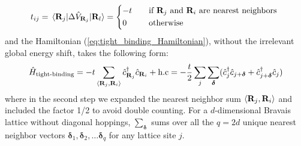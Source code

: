 \documentclass[11pt, a4paper, oneside]{book}
\theoremstyle{definition} %
\begin{document}
\begin{equation}
	t_{ij} = \mel{\mathbf{R}_j}{\Delta \hat{V}_{\mathbf{R}_j}}{\mathbf{R}_l} = \begin{dcases}
		-t \quad &\text{if $\mathbf{R}_j$ and $\mathbf{R}_i$ are nearest neighbors }\\
		0 \quad & \text{otherwise}
		\end{dcases}
\end{equation}
and the Hamiltonian (\ref{eq:tight_binding_Hamiltonian}), without the irrelevant global energy shift, takes the following form:
\begin{equation}
	\hat{H}_{\text{tight-binding}} = - t \sum_{\expval{\mathbf{R}_j, \mathbf{R}_i}} \hat{c}_{\mathbf{R}_j}^\dagger \hat{c}_{\mathbf{R}_i} + \text{h.c} = -\frac{t}{2} \sum_{j}\sum_{\bm{\delta}} (\hat{c}_j^\dagger \hat{c}_{j + \bm{\delta}} + \hat{c}_{j + \bm{\delta}}^\dagger \hat{c}_j)
	\label{eq:general_tight_binding_secondquant}
\end{equation}
where in the second step we expanded the nearest neighbor sum $\expval{\mathbf{R}_j,\mathbf{R}_i}$ and included the factor 1/2 to avoid double counting. For a $d$-dimensional Bravais lattice without diagonal hoppings, $\sum_{\bm{\delta}}$ sums over all the $q = 2d$ unique nearest neighbor vectors $\bm{\delta}_1, \bm{\delta}_2, \dots \bm{\delta}_q$ for any lattice site $j$.

\end{document}
